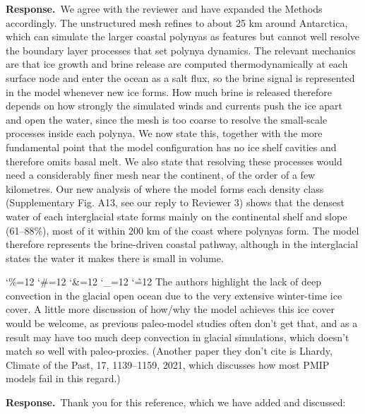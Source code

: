 \documentclass[11pt,a4paper]{article}
\newcommand{\comment}[1]{\par\medskip\noindent\color{black}\begingroup\catcode`\%=12 \catcode`\#=12 \catcode`\&=12 \catcode`\_=12 \catcode`\~=12 \commentbody}
\newcommand{\commentbody}[1]{#1\endgroup\par\smallskip}
\newcommand{\response}{\par\noindent\color{chgcol}\textbf{Response.}\ }
\begin{document}
\response We agree with the reviewer and have expanded the Methods accordingly. The unstructured mesh refines to about 25 km around Antarctica, which can simulate the larger coastal polynyas as features but cannot well resolve the boundary layer processes that set polynya dynamics. The relevant mechanics are that ice growth and brine release are computed thermodynamically at each surface node and enter the ocean as a salt flux, so the brine signal is represented in the model whenever new ice forms. How much brine is released therefore depends on how strongly the simulated winds and currents push the ice apart and open the water, since the mesh is too coarse to resolve the small-scale processes inside each polynya. We now state this, together with the more fundamental point that the model configuration has no ice shelf cavities and therefore omits basal melt. We also state that resolving these processes would need a considerably finer mesh near the continent, of the order of a few kilometres. Our new analysis of where the model forms each density class (Supplementary Fig. A13, see our reply to Reviewer 3) shows that the densest water of each interglacial state forms mainly on the continental shelf and slope (61--88\%), most of it within 200 km of the coast where polynyas form. The model therefore represents the brine-driven coastal pathway, although in the interglacial states the water it makes there is small in volume.


\comment{R2}{The authors highlight the lack of deep convection in the glacial open ocean due to the very extensive winter-time ice cover. A little more discussion of how/why the model achieves this ice cover would be welcome, as previous paleo-model studies often don't get that, and as a result may have too much deep convection in glacial simulations, which doesn't match so well with paleo-proxies. (Another paper they don't cite is Lhardy, Climate of the Past, 17, 1139–1159, 2021, which discusses how most PMIP models fail in this regard.)}


\response Thank you for this reference, which we have added and discussed:
\end{document}
